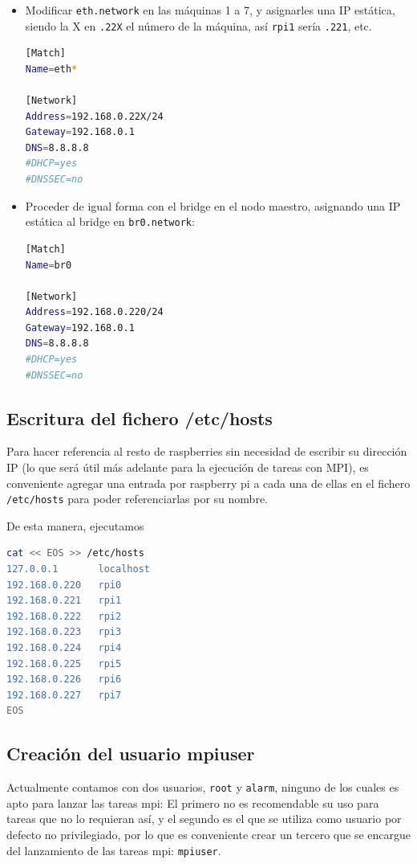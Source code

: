 \begin{itemize}
    \item Modificar \texttt{eth.network} en las máquinas 1 a 7, y asignarles una IP estática, siendo la X en \texttt{.22X} el número de la máquina, así \texttt{rpi1} sería \texttt{.221}, etc.
\begin{lstlisting}[language=bash]
[Match]
Name=eth*

[Network]
Address=192.168.0.22X/24
Gateway=192.168.0.1
DNS=8.8.8.8
#DHCP=yes
#DNSSEC=no
\end{lstlisting}
    \item Proceder de igual forma con el bridge en el nodo maestro, asignando una IP estática al bridge en \texttt{br0.network}:
\begin{lstlisting}[language=bash]
[Match]
Name=br0

[Network]
Address=192.168.0.220/24
Gateway=192.168.0.1
DNS=8.8.8.8
#DHCP=yes
#DNSSEC=no
\end{lstlisting}
\end{itemize}

\subsection{Escritura del fichero /etc/hosts}
Para hacer referencia al resto de raspberries sin necesidad de escribir su dirección IP (lo que será útil más adelante para la ejecución de tareas con MPI), es conveniente agregar una entrada por raspberry pi a cada una de ellas en el fichero \texttt{/etc/hosts} para poder referenciarlas por su nombre.

De esta manera, ejecutamos
\begin{lstlisting}[language=bash]
cat << EOS >> /etc/hosts
127.0.0.1       localhost
192.168.0.220   rpi0
192.168.0.221   rpi1
192.168.0.222   rpi2
192.168.0.223   rpi3
192.168.0.224   rpi4
192.168.0.225   rpi5
192.168.0.226   rpi6
192.168.0.227   rpi7
EOS
\end{lstlisting}

\subsection{Creación del usuario mpiuser}
Actualmente contamos con dos usuarios, \texttt{root} y \texttt{alarm}, ninguno de los cuales es apto para lanzar las tareas mpi: El primero no es recomendable su uso para tareas que no lo requieran así, y el segundo es el que se utiliza como usuario por defecto no privilegiado, por lo que es conveniente crear un tercero que se encargue del lanzamiento de las tareas mpi: \texttt{mpiuser}.

